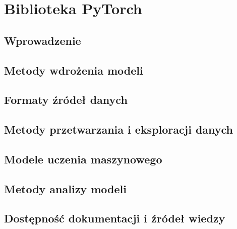 \chapter{Biblioteka PyTorch}

\section{Wprowadzenie}
\section{Metody wdrożenia modeli}
\section{Formaty źródeł danych}
\section{Metody przetwarzania i eksploracji danych}
\section{Modele uczenia maszynowego}
\section{Metody analizy modeli}
\section{Dostępność dokumentacji i źródeł wiedzy}